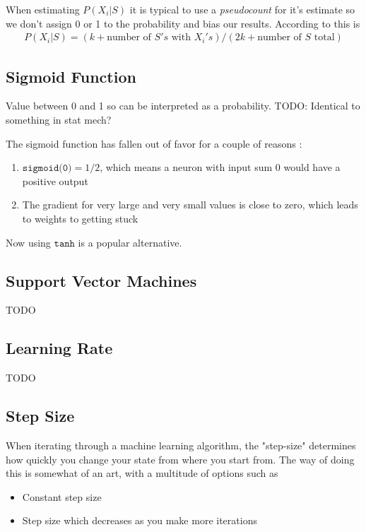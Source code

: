 When estimating $P(X_i|S)$ it is typical to use a \textit{pseudocount} for it's estimate so we don't assign 0 or 1 to the probability and bias our results. According to \cite{sutton} this is
\begin{align}
	P(X_i|S) = (k+\textrm{number~of~} S's\textrm{~with~} X_i's) / (2k+\textrm{number~of~} S \textrm{~total})
\end{align}


\subsection{Sigmoid Function}
Value between 0 and 1 so can be interpreted as a probability. TODO: Identical to something in stat mech?

The sigmoid function has fallen out of favor for a couple of reasons \cite{grus}:
\begin{enumerate}
	\item $\texttt{sigmoid(0)} = 1/2$, which means a neuron with input sum 0 would have a positive output
	\item The gradient for very large and very small values is close to zero, which leads to weights to getting stuck
\end{enumerate}
Now using $\texttt{tanh}$ is a popular alternative.

\subsection{Support Vector Machines}
TODO
\subsection{Learning Rate}
TODO

\subsection{Step Size}
When iterating through a machine learning algorithm, the "step-size" determines how quickly you change your state from where you start from. The way of doing this is somewhat of an art, with a multitude of options such as 
\begin{itemize}
	\item Constant step size
	\item Step size which decreases as you make more iterations
\end{itemize}

